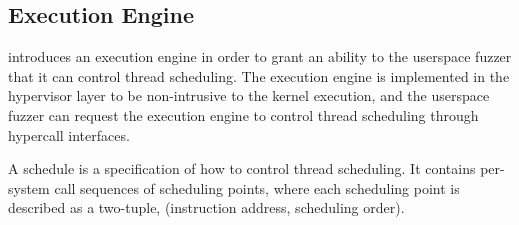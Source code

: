 


\subsection{Execution Engine}
\label{ss:engine}

\sys introduces an execution engine in order to grant an ability to
the userspace fuzzer that it can control thread scheduling.
%
The execution engine is implemented in the hypervisor layer to be
non-intrusive to the kernel execution, and the userspace fuzzer can
request the execution engine to control thread scheduling through
hypercall interfaces.


%
A schedule is a specification of how to control thread scheduling.
%
It contains per-system call sequences of scheduling points, where each
scheduling point is described as a two-tuple, (instruction address,
scheduling order).

